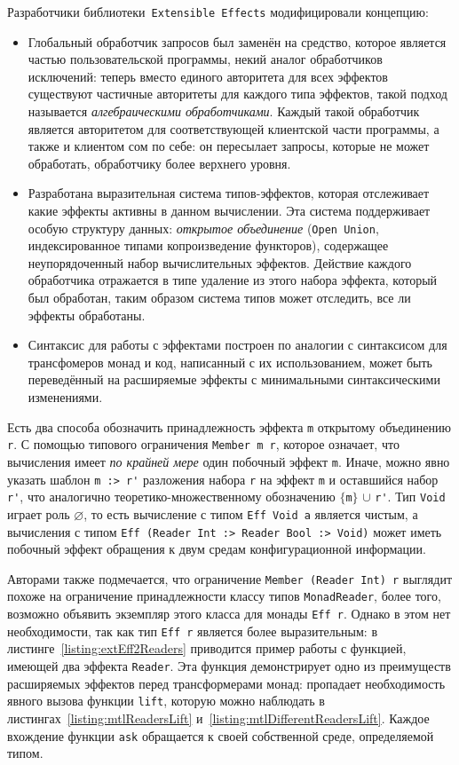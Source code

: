 Разработчики библиотеки~\lstinline{Extensible Effects} модифицировали концепцию: 

\begin{itemize}
  \item 
Глобальный обработчик запросов был заменён на средство, которое является частью пользовательской программы, некий аналог обработчиков исключений: теперь вместо единого авторитета для всех эффектов существуют частичные авторитеты для каждого типа эффектов, такой подход называется \emph{алгебраическими обработчиками}. Каждый такой обработчик является авторитетом для соответствующей клиентской части программы, а также и клиентом сом по себе: он пересылает запросы, которые не может обработать, обработчику более верхнего уровня. 
  \item 
Разработана выразительная система типов-эффектов, которая отслеживает какие эффекты активны в данном вычислении. Эта система поддерживает особую структуру данных: \emph{открытое объединение} (\lstinline{Open Union}, индексированное типами копроизведение функторов), содержащее неупорядоченный набор вычислительных эффектов. Действие каждого обработчика отражается в типе удаление из этого набора эффекта, который был обработан, таким образом система типов может отследить, все ли эффекты обработаны. 
  \item 
Синтаксис для работы с эффектами построен по аналогии с синтаксисом для трансфомеров монад и код, написанный с их использованием, может быть переведённый на расширяемые эффекты с минимальными синтаксическими изменениями.  
\end{itemize} 

Есть два способа обозначить принадлежность эффекта \lstinline{m} открытому объединению \lstinline{r}. С помощью типового ограничения \lstinline{Member m r}, которое означает, что вычисления имеет \emph{по крайней мере} один побочный эффект \lstinline{m}. Иначе, можно явно указать шаблон \lstinline{m :> r'} разложения набора \lstinline{r} на эффект \lstinline{m} и оставшийся набор \lstinline{r'}, что аналогично теоретико-множественному обозначению $\{$\lstinline{m}$\}$ $\cup$ \lstinline{r'}. Тип \lstinline{Void} играет роль $\varnothing$, то есть вычисление с типом \lstinline{Eff Void a} является чистым, а вычисления с типом \lstinline{Eff (Reader Int :> Reader Bool :> Void)} может иметь побочный эффект обращения к двум средам конфигурационной информации.

Авторами также подмечается, что ограничение \lstinline{Member (Reader Int) r} выглядит похоже на ограничение принадлежности классу типов \lstinline{MonadReader}, более того, возможно объявить экземпляр этого класса для монады \lstinline{Eff r}. Однако в этом нет необходимости, так как тип \lstinline{Eff r} является более выразительным: в листинге~\ref{listing:extEff2Readers} приводится пример работы с функцией, имеющей два эффекта \lstinline{Reader}. Эта функция демонстрирует одно из преимуществ расширяемых эффектов перед трансформерами монад: пропадает необходимость явного вызова функции \lstinline{lift}, которую можно наблюдать в листингах~\ref{listing:mtlReadersLift} и~\ref{listing:mtlDifferentReadersLift}. Каждое вхождение функции \lstinline{ask} обращается к своей собственной среде, определяемой типом. 

